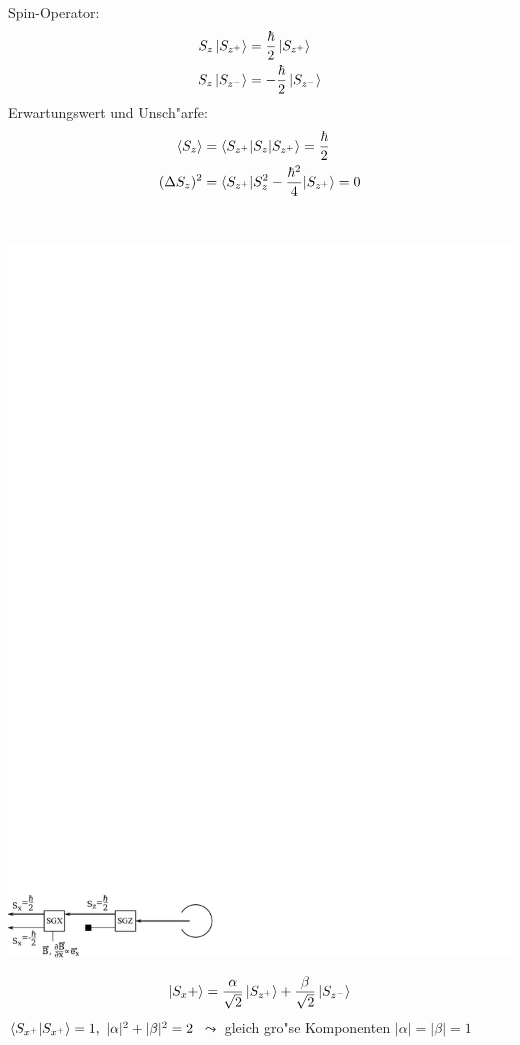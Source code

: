 \documentclass[a4paper]{scrartcl}
\begin{document}
{\begin{aaufz}
Spin-Operator:
\begin{align}
\begin{split}
S_z \ket{ S_{z^+}} & = \frac \hbar 2 \ket{ S_{z^+}} \\
S_z \ket{S_{z^-}} & = - \frac \hbar 2 \ket{S_{z^-}}
\end{split}
\end{align}
Erwartungswert und Unsch"arfe:
\begin{align}
\braket{ S_z }& = \braket{ S_{z^+} | S_z | S_{z^+}} = \frac \hbar 2 \\
(\Delta S_z)^2 & = \braket { S_{z^+}  | S_z^2 - \frac {\hbar^2}4 | S_{z^+}} = 0 \notag
\end{align}
\item \
\begin{center}
\includegraphics{059SGXSGZ}
\end{center}
$$\ket {S_x+} = \frac \alpha {\sqrt2} \ket{S_{z^+}} + \frac \beta {\sqrt2} \ket{S_{z^-}}$$
$\braket{ S_{x^+} | S_{x^+}} = 1, \ \vert \alpha \vert ^2 + \vert \beta \vert ^2 = 2$ $\leadsto$ gleich gro"se Komponenten $\vert \alpha \vert = \vert \beta \vert = 1$


\end{aaufz}}
\end{document}

